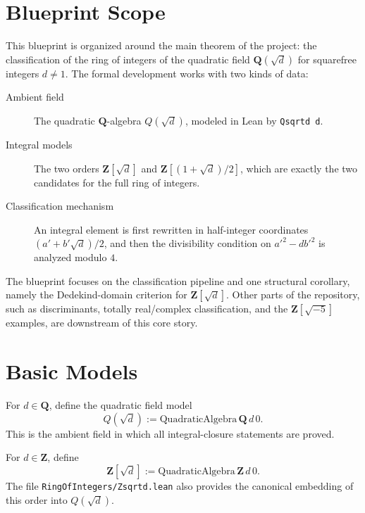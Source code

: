
\chapter{Blueprint Scope}

This blueprint is organized around the main theorem of the project: the
classification of the ring of integers of the quadratic field
$\mathbf{Q}(\sqrt d)$ for squarefree integers $d \neq 1$.
The formal development works with two kinds of data:
\begin{description}
\item[Ambient field] The quadratic $\mathbf{Q}$-algebra $Q(\sqrt d)$, modeled in
Lean by \verb|Qsqrtd d|.
\item[Integral models] The two orders $\mathbf{Z}[\sqrt d]$ and
$\mathbf{Z}[(1+\sqrt d)/2]$, which are exactly the two candidates for the full
ring of integers.
\item[Classification mechanism] An integral element is first rewritten in
half-integer coordinates $(a' + b' \sqrt d)/2$, and then the divisibility
condition on $a'^2 - d b'^2$ is analyzed modulo $4$.
\end{description}

The blueprint focuses on the classification pipeline and one structural
corollary, namely the Dedekind-domain criterion for $\mathbf{Z}[\sqrt d]$.
Other parts of the repository, such as discriminants, totally real/complex
classification, and the $\mathbf{Z}[\sqrt{-5}]$ examples, are downstream of this
core story.

\chapter{Basic Models}

\begin{definition}\label{def:qsqrtd}%
\leanok
For $d \in \mathbf{Q}$, define the quadratic field model
\[
  Q(\sqrt d) := \mathrm{QuadraticAlgebra}\,\mathbf{Q}\, d\, 0.
\]
This is the ambient field in which all integral-closure statements are proved.
\end{definition}

\begin{definition}\label{def:zsqrtd}%
\leanok
For $d \in \mathbf{Z}$, define
\[
  \mathbf{Z}[\sqrt d] := \mathrm{QuadraticAlgebra}\,\mathbf{Z}\, d\, 0.
\]
The file \verb|RingOfIntegers/Zsqrtd.lean| also provides the canonical embedding
of this order into $Q(\sqrt d)$.
\end{definition}


